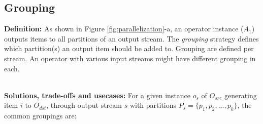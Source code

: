 \subsection{Grouping}

\noindent \textbf{Definition:} As shown in Figure \ref{fig:parallelization}-a, an operator instance ($A_1$) outputs items to all partitions of an output stream. The \textit{grouping} strategy defines which partition(s) an output item should be added to. Grouping are defined per stream. An operator with various input streams might have different grouping in each.

\noindent \textbf{\\Solutions, trade-offs and usecases:}
For a given instance $o_s$ of $O_{src}$ generating item $i$ to $O_{dst}$, through output stream $s$ with partitions $P_s=\{p_1, p_2, ..., p_k\}$, the common groupings are:

